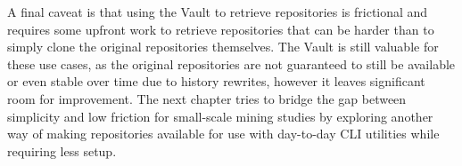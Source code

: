 A final caveat is that using the Vault to retrieve repositories is frictional
and requires some upfront work to retrieve repositories that can be harder than
to simply clone the original repositories themselves. The Vault is still
valuable for these use cases, as the original repositories are not guaranteed to
still be available or even stable over time due to history rewrites, however it
leaves significant room for improvement.  The next chapter tries to bridge the
gap between simplicity and low friction for small-scale mining studies by
exploring another way of making repositories available for use with day-to-day
CLI utilities while requiring less setup.

